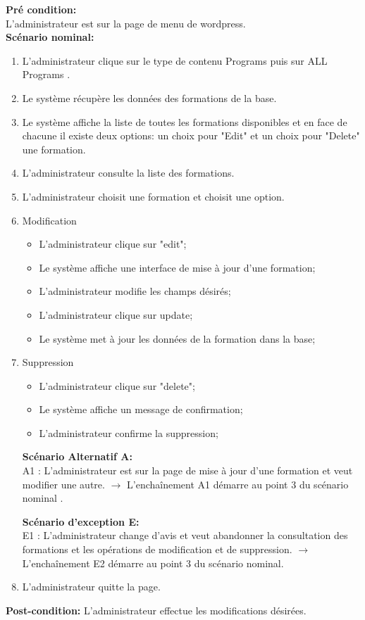 \textbf{Pré condition:}\\
L'administrateur est sur la page de menu de wordpress.\\
\textbf{Scénario nominal:}
\begin{enumerate}
	\item L'administrateur clique sur le type de contenu Programs puis sur ALL Programs .
	\item Le système récupère les données des formations de la base. 
	\item Le système affiche la liste de toutes les formations disponibles et en face de chacune il existe deux options: un choix pour "Edit" et un choix pour "Delete" une formation.
	\item L'administrateur consulte la liste des formations.
	\item L'administrateur choisit une formation et choisit une option.
	\item Modification
	\begin{itemize}
		\item L'administrateur clique sur "edit";
		\item Le système affiche une interface de mise à jour d'une formation;
		\item L'administrateur modifie les champs désirés;
		\item L'administrateur clique sur update;
		\item Le système met à jour les données de la formation dans la base;
	\end{itemize}
	
	\item Suppression
	\begin{itemize}
		\item L'administrateur clique sur "delete";
		\item Le système affiche un message de confirmation;
		\item L'administrateur confirme la suppression;
	\end{itemize}
	
	\textbf{Scénario Alternatif A:}\\
	A1 : L'administrateur est sur la page de mise à jour d'une formation et veut modifier une autre.
	$\rightarrow$ L'enchaînement A1 démarre au point 3 du scénario nominal
	.
	
	
	\textbf{Scénario d'exception E:}\\
	E1 : L'administrateur change d'avis et veut abandonner la consultation des formations et les opérations de modification et de suppression.
	$\rightarrow$ L'enchaînement E2 démarre au point 3 du scénario nominal.
	
	\item L'administrateur quitte la page.
\end{enumerate}
\textbf{Post-condition:}
L'administrateur effectue les modifications désirées.
